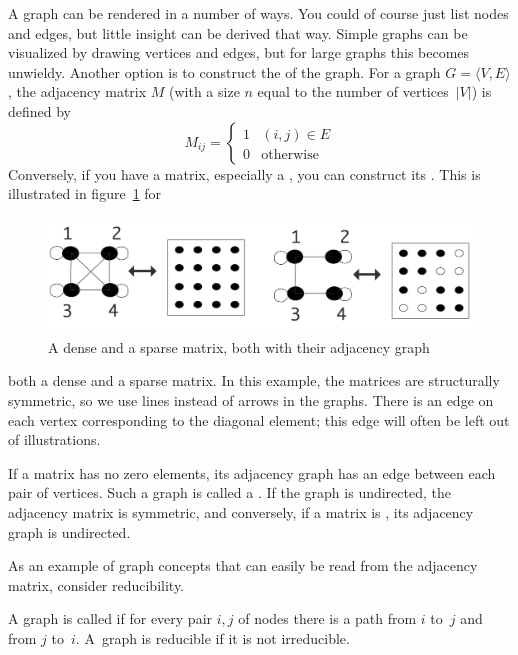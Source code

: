 A graph can be rendered in a number of ways. You could of course just
list nodes and edges, but little insight can be derived that way.
Simple graphs can be  visualized by drawing vertices and edges, but
for large graphs this becomes unwieldy. Another option is to construct
the  of the graph. For a graph $G=\langle
V,E\rangle$, the adjacency matrix $M$ (with a size $n$ equal to the
number of vertices~$|V|$) is defined by
\[ 
  M_{ij}=
  \begin{cases}1&(i,j)\in E\\ 0&\mbox{otherwise}\end{cases}
\]
Conversely, if you have a matrix, especially a
, you can construct its
.
This is illustrated in figure~\ref{fig:matrix-graph} for
\begin{figure}[ht]
  \includegraphics[scale=.14]{graphics-public/matrix-graph}
  \caption{A dense and a sparse matrix, both with their adjacency
    graph}
  \label{fig:matrix-graph}
\end{figure}
both a dense and a sparse matrix. In this example, the matrices are
structurally symmetric, so we use lines instead of arrows in the
graphs. There is an edge on each vertex corresponding to the diagonal
element; this edge will often be left out of illustrations.

If a matrix has no zero elements, its adjacency graph has an edge
between each pair of vertices. Such a graph is called a
.
If the graph is undirected, the adjacency matrix is symmetric, and
conversely, if a matrix is , its
adjacency graph is undirected.

As an example of graph concepts that can easily be read from the
adjacency matrix, consider reducibility.

\begin{definition}
A graph is called  if for every pair $i,j$ of
nodes there is a path from $i$ to~$j$ and from $j$ to~$i$. A~graph is
reducible if it is not irreducible.
\end{definition}

